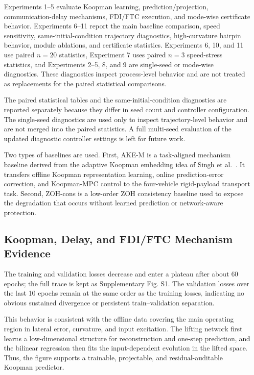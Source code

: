 \documentclass[twocolumn,3p,times,procedia]{elsarticle}
\newcommand{\AKE}{AKE-M}
\newcommand{\ZOHcons}{ZOH-cons}
\begin{document}
Experiments 1--5 evaluate Koopman learning, prediction/projection, communication-delay mechanisms, FDI/FTC execution, and mode-wise certificate behavior. Experiments 6--11 report the main baseline comparison, speed sensitivity, same-initial-condition trajectory diagnostics, high-curvature hairpin behavior, module ablations, and certificate statistics. Experiments 6, 10, and 11 use paired $n=20$ statistics, Experiment 7 uses paired $n=3$ speed-stress statistics, and Experiments 2--5, 8, and 9 are single-seed or mode-wise diagnostics. These diagnostics inspect process-level behavior and are not treated as replacements for the paired statistical comparisons.

The paired statistical tables and the same-initial-condition diagnostics are reported separately because they differ in seed count and controller configuration. The single-seed diagnostics are used only to inspect trajectory-level behavior and are not merged into the paired statistics. A full multi-seed evaluation of the updated diagnostic controller settings is left for future work.

Two types of baselines are used. First, \AKE{} is a task-aligned mechanism baseline derived from the adaptive Koopman embedding idea of Singh et al.~\cite{singh2025adaptiveKoopman}. It transfers offline Koopman representation learning, online prediction-error correction, and Koopman-MPC control to the four-vehicle rigid-payload transport task. Second, \ZOHcons{} is a low-order ZOH consistency baseline used to expose the degradation that occurs without learned prediction or network-aware protection.

\subsection{Koopman, Delay, and FDI/FTC Mechanism Evidence}

The training and validation losses decrease and enter a plateau after about 60 epochs; the full trace is kept as Supplementary Fig. S1. The validation losses over the last 10 epochs remain at the same order as the training losses, indicating no obvious sustained divergence or persistent train--validation separation.

This behavior is consistent with the offline data covering the main operating region in lateral error, curvature, and input excitation. The lifting network first learns a low-dimensional structure for reconstruction and one-step prediction, and the bilinear regression then fits the input-dependent evolution in the lifted space. Thus, the figure supports a trainable, projectable, and residual-auditable Koopman predictor.
\end{document}
